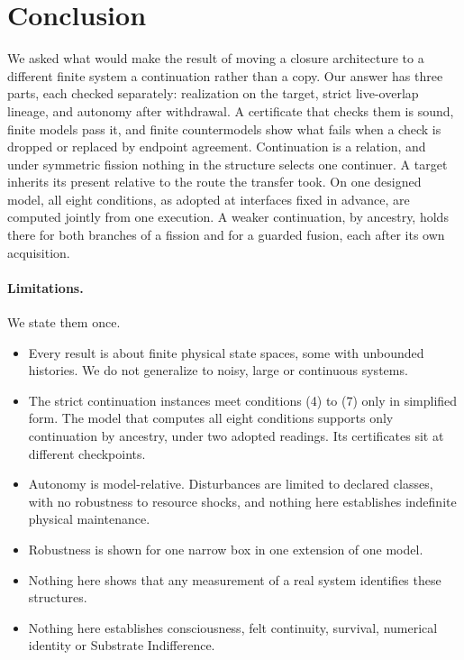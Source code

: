 \section{Conclusion}
\label{sec:conclusion}

We asked what would make the result of moving a closure architecture to a
different finite system a continuation rather than a copy. Our answer has three
parts, each checked separately: realization on the target, strict live-overlap
lineage, and autonomy after withdrawal. A certificate that checks them is
sound, finite models pass it, and finite countermodels show what fails when a
check is dropped or replaced by endpoint agreement. Continuation is a relation,
and under symmetric fission nothing in the structure selects one continuer. A
target inherits its present relative to the route the transfer took. On one
designed model, all eight conditions, as adopted at interfaces fixed in
advance, are computed jointly from one execution. A weaker continuation, by
ancestry, holds there for both branches of a fission and for a guarded fusion,
each after its own acquisition.

\paragraph{Limitations.}
We state them once.
\begin{itemize}
\item Every result is about finite physical state spaces, some with unbounded
histories. We do not generalize to noisy, large or continuous systems.
\item The strict continuation instances meet conditions (4) to (7) only in
simplified form. The model that computes all eight conditions supports only
continuation by ancestry, under two adopted readings. Its certificates sit at
different checkpoints.
\item Autonomy is model-relative. Disturbances are limited to declared
classes, with no robustness to resource shocks, and nothing here establishes
indefinite physical maintenance.
\item Robustness is shown for one narrow box in one extension of one model.
\item Nothing here shows that any measurement of a real system identifies
these structures.
\item Nothing here establishes consciousness, felt continuity, survival,
numerical identity or Substrate Indifference.
\end{itemize}

